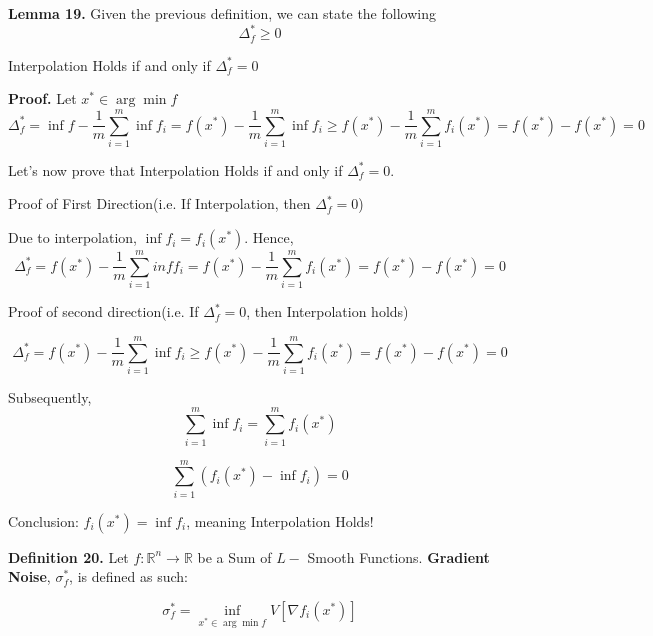 \noindent \textbf{Lemma 19.} Given the previous definition, we can state the following 
\begin{equation}
    \Delta^*_f \geq 0
\end{equation}

Interpolation Holds if and only if $\Delta^*_f = 0$ 

\noindent \textbf{Proof.} Let $x^* \in \arg \min f$
\begin{equation}
    \Delta^*_f = \inf f - \frac{1}{m} \sum_{i=1}^{m} \inf f_i = f(x^*) - \frac{1}{m} \sum_{i=1}^{m} \inf f_i \geq f(x^*) - \frac{1}{m} \sum_{i=1}^{m} f_i(x^*) = f(x^*) - f(x^*) = 0
\end{equation}

\noindent Let's now prove that Interpolation Holds if and only if $\Delta^*_f = 0$. 

\noindent Proof of First Direction(i.e. If Interpolation, then $\Delta^*_f = 0$)

\noindent Due to interpolation, $\inf f_i = f_i(x^*)$. Hence, 
\begin{equation}
    \Delta^*_f = f(x^*) - \frac{1}{m} \sum_{i=1}^{m} inf f_i = f(x^*) - \frac{1}{m} \sum_{i=1}^{m} f_i(x^*) = f(x^*) - f(x^*) = 0
\end{equation}

\noindent Proof of second direction(i.e. If $\Delta^*_f = 0$, then Interpolation holds)

\begin{equation}
    \Delta^*_f = f(x^*) - \frac{1}{m} \sum_{i=1}^{m} \inf f_i \geq f(x^*) - \frac{1}{m} \sum_{i=1}^{m} f_i(x^*) = f(x^*) - f(x^*) = 0
\end{equation}

Subsequently, 
\begin{equation}
    \sum_{i=1}^{m} \inf f_i = \sum_{i=1}^{m} f_i(x^*)
\end{equation}

\begin{equation}
    \sum_{i=1}^{m} (f_i(x^*) - \inf f_i) = 0
\end{equation}

Conclusion: $f_i(x^*) = \inf f_i$, meaning Interpolation Holds!


\noindent \textbf{Definition 20.} Let $f: \mathbb{R}^n \rightarrow \mathbb{R}$ be a Sum of $L-$ Smooth Functions. \textbf{Gradient Noise}, $\sigma_f^*$, is defined as such:

\begin{equation}
    \sigma_f^* = \inf_{x^* \in \arg \min f} V[\nabla f_i(x^*)]
\end{equation}

